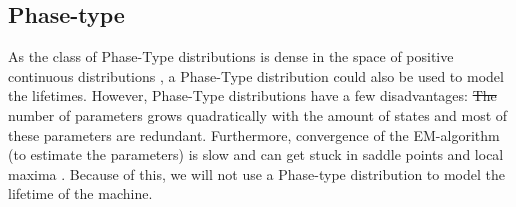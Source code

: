 \documentclass[a4paper]{thesis}
\theoremstyle{definition}
\providecommand{\DIFaddtex}[1]{{\protect\color{blue}\uwave{#1}}} %
\providecommand{\DIFdeltex}[1]{{\protect\color{red}\sout{#1}}}                      %
\providecommand{\DIFaddbegin}{} %
\providecommand{\DIFaddend}{} %
\providecommand{\DIFdelbegin}{} %
\providecommand{\DIFdelend}{} %
\providecommand{\DIFadd}[1]{\texorpdfstring{\DIFaddtex{#1}}{#1}} %
\providecommand{\DIFdel}[1]{\texorpdfstring{\DIFdeltex{#1}}{}} %
\newcommand{\DIFscaledelfig}{0.5}
\newlength{\DIFdelgraphicswidth} %
\newlength{\DIFdelgraphicsheight} %
\newcommand{\DIFaddincludegraphics}[2][]{{\color{blue}\fbox{\DIFOincludegraphics[#1]{#2}}}} %
\newcommand{\DIFdelincludegraphics}[2][]{%
	\sbox{\DIFdelgraphicsbox}{\DIFOincludegraphics[#1]{#2}}%
	\settoboxwidth{\DIFdelgraphicswidth}{\DIFdelgraphicsbox} %
	\settoboxtotalheight{\DIFdelgraphicsheight}{\DIFdelgraphicsbox} %
	\scalebox{\DIFscaledelfig}{%
		\parbox[b]{\DIFdelgraphicswidth}{\usebox{\DIFdelgraphicsbox}\\[-\baselineskip] \rule{\DIFdelgraphicswidth}{0em}}\llap{\resizebox{\DIFdelgraphicswidth}{\DIFdelgraphicsheight}{%
				\setlength{\unitlength}{\DIFdelgraphicswidth}%
				\begin{picture}(1,1)%
				\thicklines\linethickness{2pt} %
				{\color[rgb]{1,0,0}\put(0,0){\framebox(1,1){}}}%
				{\color[rgb]{1,0,0}\put(0,0){\line( 1,1){1}}}%
				{\color[rgb]{1,0,0}\put(0,1){\line(1,-1){1}}}%
				\end{picture}%
			}\hspace*{3pt}}} %
} %
\DeclareRobustCommand{\DIFaddbegin}{\DIFOaddbegin \let\includegraphics\DIFaddincludegraphics} %
\DeclareRobustCommand{\DIFaddend}{\DIFOaddend \let\includegraphics\DIFOincludegraphics} %
\DeclareRobustCommand{\DIFdelbegin}{\DIFOdelbegin \let\includegraphics\DIFdelincludegraphics} %
\DeclareRobustCommand{\DIFdelend}{\DIFOaddend \let\includegraphics\DIFOincludegraphics} %
\begin{document}
	\subsection{Phase-type}
	As the class of Phase-Type distributions is dense in the space of positive continuous distributions \cite{Ocinneide1999}, a Phase-Type distribution could also be used to model the lifetimes.
	However, Phase-Type distributions have a few disadvantages:
	\DIFdelbegin \DIFdel{The }\DIFdelend \DIFaddbegin \DIFadd{the }\DIFaddend number of parameters grows quadratically with the amount of states and most of these parameters are redundant.
	Furthermore, convergence of the EM-algorithm (to estimate the parameters) is slow and can get stuck in saddle points and local maxima \cite{Asmussen1996}.
	Because of this, we will not use a Phase-type distribution to model the lifetime of the machine.
	
\end{document}
